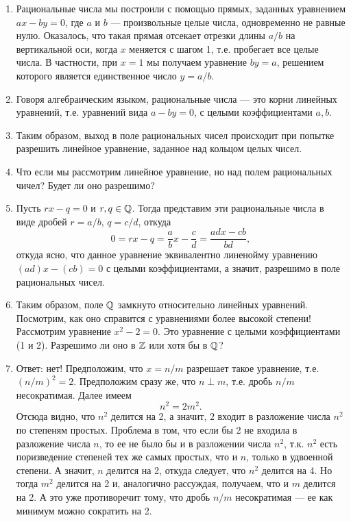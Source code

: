 \begin{enumerate}
\item Рациональные числа мы построили с помощью прямых, заданных уравнением $ax-by=0$, где $a$ и $b$ --- произвольные целые числа, одновременно не равные нулю. Оказалось, что такая прямая отсекает отрезки длины $a/b$ на вертикальной оси, когда $x$ меняется с шагом 1, т.е. пробегает все целые числа. В частности, при $x=1$ мы получаем уравнение $by=a$, решением которого является единственное число $y=a/b$.
\item Говоря алгебраическим языком, рациональные числа --- это корни линейных уравнений, т.е. уравнений вида $a-by=0$, с целыми коэффициентами $a,b$.
\item Таким образом, выход в поле рациональных чисел происходит при попытке разрешить линейное уравнение, заданное над кольцом целых чисел.
\item Что если мы рассмотрим линейное уравнение, но над полем рациональных чичел? Будет ли оно разрешимо?
\item Пусть $rx-q=0$ и $r,q\in\mathbb Q$. Тогда представим эти рациональные числа в виде дробей $r=a/b$, $q=c/d$, откуда
$$
0=rx-q = \frac{a}{b}x-\frac{c}{d} = \frac{adx-cb}{bd},
$$
откуда ясно, что данное уравнение эквивалентно линенойму уравнению $(ad)x-(cb)=0$ с целыми коэффициентами, а значит, разрешимо в поле рациональных чисел.
\item Таким образом, поле $\mathbb Q$ замкнуто относительно линейных уравнений. Посмотрим, как оно справится с уравнениями более высокой степени! Рассмотрим уравнение $x^2-2=0$. Это уравнение с целыми коэффициентами (1 и 2). Разрешимо ли оно в $\mathbb Z$ или хотя бы в $\mathbb Q$?
\item Ответ: нет! Предположим, что $x=n/m$ разрешает такое уравнение, т.е. $(n/m)^2=2$. Предположим сразу же, что $n\perp m$, т.е. дробь $n/m$ несократимая. Далее имеем
$$
n^2=2m^2.
$$
Отсюда видно, что $n^2$ делится на 2, а значит, $2$ входит в разложение числа $n^2$ по степеням простых. Проблема в том, что если бы 2 не входила в разложение числа $n$, то ее не было бы и в разложении числа $n^2$, т.к. $n^2$ есть поризведение степеней тех же самых простых, что и $n$, только в удвоенной степени. А значит, $n$ делится на 2, откуда следует, что $n^2$ делится на 4. Но тогда $m^2$ делится на 2 и, аналогично рассуждая, получаем, что и $m$ делится на 2. А это уже противоречит тому, что дробь $n/m$ несократимая --- ее как минимум можно сократить на 2.


\end{enumerate}
